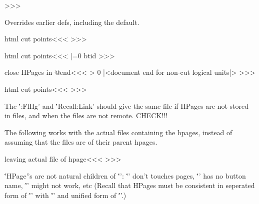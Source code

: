 {{\def\End:HPage#1{%
   \ifnum \HPageDepth<1 \:warning{\string\EndHPage{#1}?}\let\:temp|=\:gobble
   \else  \ifinner\else\:clearpage\fi   \PopStack\:btid\:tempa
      \def\:tempb{#1}\ifx  \:tempb\empty\let\:temp|=\:EndHPage
      \else  \ifx  \:tempb\:tempa       \let\:temp|=\:EndHPage
      \else  \Recall:HPageTag\:tempa
             \Save:HPageTag\:tempa
             \ifx  \:tempb\:tempa       \let\:temp|=\:EndHPage
      \else                    \def\:temp{\:EndHPage\End:HPage{#1}}%
   \fi\fi\fi\fi
   \:temp }

\def\:EndHPage{%
   \csname EndHPage\HPageDepth \endcsname
   \global\expandafter\let\csname EndHPage\HPageDepth\endcsname|=\:UnDef
   \Recall:Link\HP:file   \Recall:Link\:tempd   \Save:Link\:tempd
   \Recall:HPage\:tempb
   \Recall:HPageTag\:tempc
   \:buttrc\EndHPage{{\:tempb}}%
   \EndFileStream{\HP:file}%
   |<leaving actual file of hpage|>%
   \FileStream{\:tempd}%
   \RecallEverypar  \gHAdvance\HPageDepth |by -1
   \PopStack\:afterbt\:temp 
   \ifx \:temp\empty \else \csname AfterHPage\endcsname \fi }
>>>


Overrides earlier defs, including the default.


\<html cut points\><<<
\def\AtEndHPage{%
   \expandafter\gdef\csname EndHPage\HPageDepth\endcsname}     
>>>


\<html cut points\><<<
\HAssign\HPageDepth|=0 
\PushStack\:btid{}
>>>


\<close HPages in @end\><<<
\ifnum \HPageDepth> 0 \EndHPage[1]{}\fi
|<document end for non-cut logical units|>%
>>>



\<html cut points\><<<
\def\Save:FileHPg{\PushStack\HPage:FlHg}
\def\Recall:FileHPg{\PopStack\HPage:FlHg}
>>>

The \''\Recall:FileHPg'  and \''Recall:Link' should give the
same file if HPages are not stored in files, and when the files are
not remote. CHECK!!! 


The following works with the actual files containing the
hpages, instead of assuming that the files are of their parent
hpages.


\<leaving actual file of hpage\><<<
>>>

\''HPage''s are not natural children of \''\FileStream': 
\''\EndHPage' don't touches pages, \''\FileStream' 
has no button name, \''\ExitHPage' might not work, etc (Recall that
HPages must be consistent in seperated form of \''\HPageButton' with
\''\beginHPage' and unified form of \''\HPage'.)


}}
